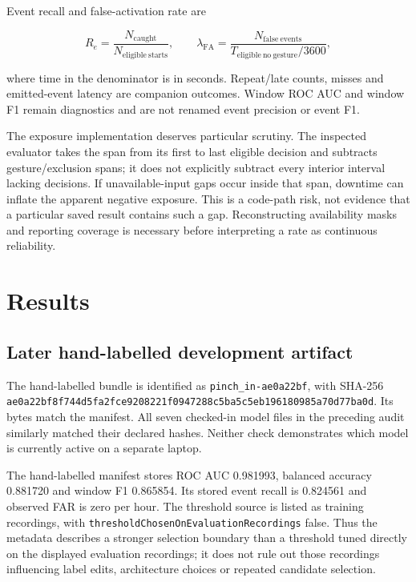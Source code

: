 Event recall and false-activation rate are

\[
R_e=\frac{N_{\mathrm{caught}}}{N_{\mathrm{eligible\ starts}}},\qquad
\lambda_{\mathrm{FA}}=\frac{N_{\mathrm{false\ events}}}{T_{\mathrm{eligible\ no\ gesture}}/3600},
\]

where time in the denominator is in seconds. Repeat/late counts, misses and emitted-event latency are companion outcomes. Window ROC AUC and window F1 remain diagnostics and are not renamed event precision or event F1.

The exposure implementation deserves particular scrutiny. The inspected evaluator takes the span from its first to last eligible decision and subtracts gesture/exclusion spans; it does not explicitly subtract every interior interval lacking decisions. If unavailable-input gaps occur inside that span, downtime can inflate the apparent negative exposure. This is a code-path risk, not evidence that a particular saved result contains such a gap. Reconstructing availability masks and reporting coverage is necessary before interpreting a rate as continuous reliability.

\section{Results}\label{results}

\subsection{Later hand-labelled development artifact}\label{later-hand-labelled-development-artifact}

The hand-labelled bundle is identified as \nolinkurl{pinch_in-ae0a22bf}, with SHA-256 \nolinkurl{ae0a22bf8f744d5fa2fce9208221f0947288c5ba5c5eb196180985a70d77ba0d}. Its bytes match the manifest. All seven checked-in model files in the preceding audit similarly matched their declared hashes. Neither check demonstrates which model is currently active on a separate laptop.

The hand-labelled manifest stores ROC AUC 0.981993, balanced accuracy 0.881720 and window F1 0.865854. Its stored event recall is 0.824561 and observed FAR is zero per hour. The threshold source is listed as training recordings, with \nolinkurl{thresholdChosenOnEvaluationRecordings} false. Thus the metadata describes a stronger selection boundary than a threshold tuned directly on the displayed evaluation recordings; it does not rule out those recordings influencing label edits, architecture choices or repeated candidate selection.

